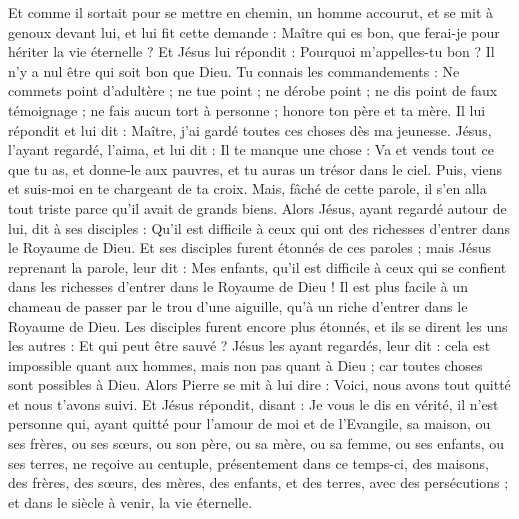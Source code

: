 \begin{multicols}{2}
Et comme il sortait pour se mettre en chemin, un homme accourut, et se mit à genoux devant lui, et lui fit cette demande : Maître qui es bon, que ferai-je pour hériter la vie éternelle ?
Et Jésus lui répondit : Pourquoi m'appelles-tu bon ? Il n'y a nul être qui soit bon que Dieu.
Tu connais les commandements : Ne commets point d'adultère ; ne tue point ; ne dérobe point ; ne dis point de faux témoignage ; ne fais aucun tort à personne ; honore ton père et ta mère.
Il lui répondit et lui dit : Maître, j'ai gardé toutes ces choses dès ma jeunesse.
Jésus, l'ayant regardé, l'aima, et lui dit : Il te manque une chose : Va et vends tout ce que tu as, et donne-le aux pauvres, et tu auras un trésor dans le ciel. Puis, viens et suis-moi en te chargeant de ta croix.
Mais, fâché de cette parole, il s'en alla tout triste parce qu'il avait de grands biens.
Alors Jésus, ayant regardé autour de lui, dit à ses disciples : Qu'il est difficile à ceux qui ont des richesses d'entrer dans le Royaume de Dieu.
Et ses disciples furent étonnés de ces paroles ; mais Jésus reprenant la parole, leur dit : Mes enfants, qu'il est difficile à ceux qui se confient dans les richesses d'entrer dans le Royaume de Dieu !
Il est plus facile à un chameau de passer par le trou d'une aiguille, qu'à un riche d'entrer dans le Royaume de Dieu.
Les disciples furent encore plus étonnés, et ils se dirent les uns les autres : Et qui peut être sauvé ?
Jésus les ayant regardés, leur dit : cela est impossible quant aux hommes, mais non pas quant à Dieu ; car toutes choses sont possibles à Dieu.
Alors Pierre se mit à lui dire : Voici, nous avons tout quitté et nous t'avons suivi.
Et Jésus répondit, disant : Je vous le dis en vérité, il n'est personne qui, ayant quitté pour l'amour de moi et de l'Evangile, sa maison, ou ses frères, ou ses sœurs, ou son père, ou sa mère, ou sa femme, ou ses enfants, ou ses terres,
ne reçoive au centuple, présentement dans ce temps-ci, des maisons, des frères, des sœurs, des mères, des enfants, et des terres, avec des persécutions ; et dans le siècle à venir, la vie éternelle.

\end{multicols}
